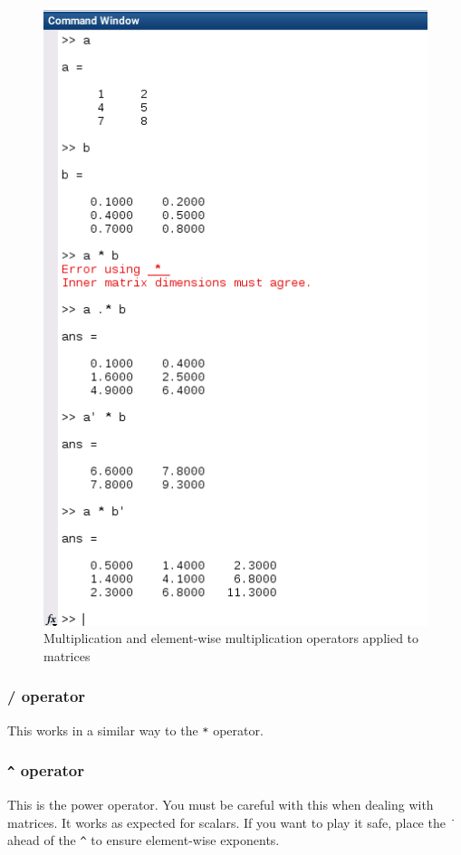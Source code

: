 \documentclass[12pt]{article}
\begin{document}
\begin{figure}[ht]
\centering
\includegraphics[scale=0.6]{mult_operator.png}
\caption{Multiplication and element-wise multiplication operators applied to matrices}
\label{fig:mult}
\end{figure}

\subsubsection{/ operator}
This works in a similar way to the \texttt{*} operator. 


\subsubsection{\texttt{\^} operator}
This is the power operator. You must be careful with this when dealing with matrices. It works as expected for scalars. If you want to play it safe, place the \texttt{\.} ahead of the \texttt{\^} to ensure element-wise exponents.
\end{document}
